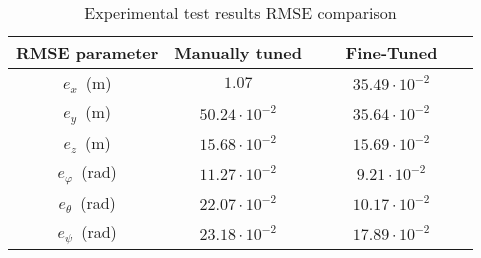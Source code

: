 \begin{table}[h!]
\centering
\caption{Experimental test results RMSE comparison}
\label{table:circular3_rmse_out}
\begin{tabular}{c|c|c}
\textbf{RMSE parameter} & \textbf{ Manually tuned} & \textbf{\ \ \ Fine-Tuned\ \ \ } \\
\hline
$e_{x}$\ (m) & $1.07$ &  $35.49\cdot 10^{-2}$ \\
$e_{y}$\ (m) & $50.24\cdot 10^{-2}$ & $35.64\cdot 10^{-2}$ \\
$e_{z}$\ (m) & $15.68\cdot 10^{-2}$ &  $15.69\cdot 10^{-2}$ \\
$e_{\varphi}$\ (rad) & $11.27\cdot 10^{-2}$ & $9.21\cdot 10^{-2}$ \\
$e_{\theta}$\ (rad) & $22.07 \cdot 10^{-2}$ &  $10.17\cdot 10^{-2}$ \\
$e_{\psi}$\ (rad) & $23.18\cdot 10^{-2}$ & $17.89\cdot 10^{-2}$ \\
\end{tabular}
\end{table}